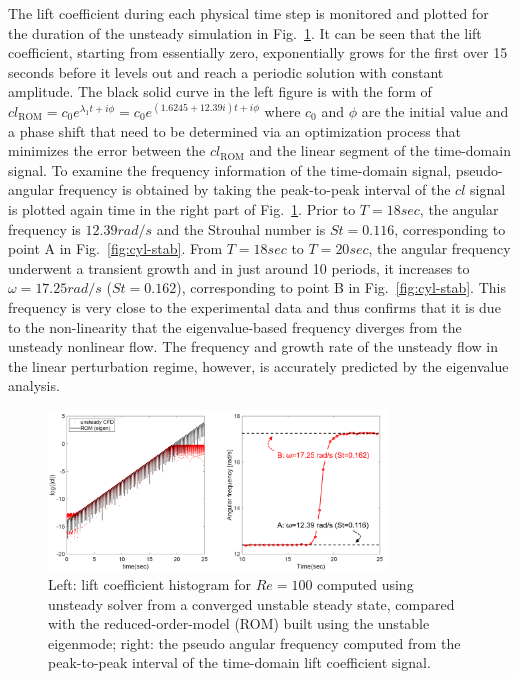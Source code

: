 \documentclass[journal,final]{new-aiaa}
\begin{document}
The lift coefficient during each physical time step is monitored
and plotted for the duration of the unsteady simulation in
Fig.~\ref{fig:cyl-re100-uns}. It can be seen that the lift
coefficient, starting from essentially zero, exponentially
grows for the first over 15 seconds before it levels out and
reach a periodic solution with constant amplitude.
The black solid curve in the left figure is with the form
of $cl_{\text{ROM}}=c_0 e^{\lambda_1 t+i\phi }=
c_0 e^{(1.6245+12.39i) t+i\phi }$ where $c_0$ and $\phi$
are the initial value and a phase shift that need to be
determined via an optimization process that minimizes the
error between the $cl_{\text{ROM}}$ and the linear segment of the
time-domain signal. To examine the frequency information
of the time-domain signal, pseudo-angular frequency is obtained
by taking the peak-to-peak interval of the $cl$ signal is plotted
again time in the right part of Fig.~\ref{fig:cyl-re100-uns}.
Prior to $T=18 sec$, the angular frequency is $12.39 rad/s$
and the Strouhal number is $St=0.116$, corresponding to point
A in Fig.~\ref{fig:cyl-stab}. From $T=18 sec$ to $T=20 sec$, the
angular frequency underwent a transient growth and in just
around 10 periods, it increases to $\omega=17.25 rad/s$ ($St=0.162$),
corresponding to point B in Fig.~\ref{fig:cyl-stab}. This frequency
is very close to the experimental data and thus confirms that it is
due to the non-linearity that the eigenvalue-based frequency diverges
from the unsteady nonlinear flow. The frequency and growth rate of
the unsteady flow in the linear perturbation regime, however, is
accurately predicted by the eigenvalue analysis.


\begin{figure}[htb]
	\centering   
	\includegraphics[width=0.8\textwidth]{frequency-shift.png}	
	\caption{Left: lift coefficient histogram for $Re=100$ computed
	using unsteady solver from a converged unstable steady state,
	compared with the reduced-order-model (ROM) built using the
	unstable eigenmode; right: the pseudo angular frequency computed
	from the peak-to-peak interval of the time-domain lift coefficient
	signal.}
	\label{fig:cyl-re100-uns}
\end{figure}
\end{document}
